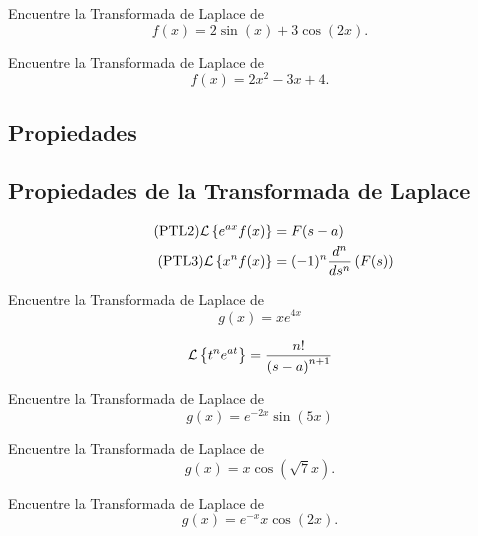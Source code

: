  \begin{resuelto}
  \label{bron:exmp:21.12}
  Encuentre la Transformada de Laplace de
  $$f(x)=2\sin(x)+3\cos(2x).$$
 \end{resuelto}




 \begin{resuelto}
  \label{bron:exmp:21.13}
  Encuentre la Transformada de Laplace de
  $$f(x)=2x^{2}-3x+4.$$
 \end{resuelto}



\subsection{Propiedades}

\subsection{Propiedades de la Transformada de Laplace}
\begin{align}
  \label{bron:21.4}
  \tag{PTL2}
  \mathcal{L}\left\{ e^{ax}f(x) \right\}&=F(s-a)\\
  \label{bron:21.5}
  \tag{PTL3}
  \mathcal{L}\left\{ x^{n}f(x) \right\}&=(-1)^{n}\dfrac{d^{n}}{ds^{n}}\left( F(s) \right)
\end{align}


%
%
%
%
%
%
%
%

%
%
%


 \begin{resuelto}
  \label{bron:exmp:21.14}
  Encuentre la Transformada de Laplace de
  $$g(x)=xe^{4x}$$
 \end{resuelto}


{}
\begin{align}
\label{tlt:22}
\mathcal{L}\left\{ t^{n}e^{at} \right\} = \dfrac{n!}{\left( s-a \right)^{n+1}}
\end{align}


 \begin{resuelto}
  \label{bron:exmp:21.15}
  Encuentre la Transformada de Laplace de
  $$g(x)=e^{-2x}\sin(5x)$$
 \end{resuelto}




 \begin{resuelto}
  \label{bron:exmp:21.16}
  Encuentre la Transformada de Laplace de
  $$g(x)=x\cos(\sqrt{7}x).$$
 \end{resuelto}




 \begin{resuelto}
  \label{bron:exmp:21.17}
  Encuentre la Transformada de Laplace de
  $$g(x)=e^{-x}x\cos(2x).$$
 \end{resuelto}






